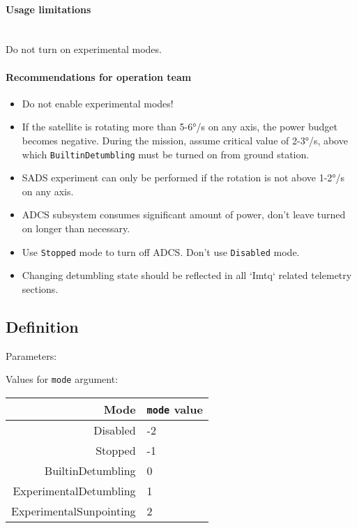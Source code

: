 \paragraph{Usage limitations} \mbox{} \\
Do not turn on experimental modes.

\paragraph{Recommendations for operation team}
\begin{itemize}
    \item Do not enable experimental modes!
    \item If the satellite is rotating more than 5-6°/s on any axis, the power budget becomes negative. During the mission, assume critical value of 2-3°/s, above which \texttt{BuiltinDetumbling} must be turned on from ground station.
    \item SADS experiment can only be performed if the rotation is not above 1-2°/s on any axis.    
    \item ADCS subsystem consumes significant amount of power, don't leave turned on longer than necessary.
    \item Use \texttt{Stopped} mode to turn off ADCS. Don't use \texttt{Disabled} mode.
    \item Changing detumbling state should be reflected in all `Imtq` related telemetry sections.
\end{itemize}

\subsection{Definition}

Parameters: 

\begin{tcarglist}	
\end{tcarglist}

Values for \texttt{mode} argument:

\begin{tabular}{r | l}
    Mode & \texttt{mode} value \\
    \hline
    Disabled & -2 \\
    Stopped & -1 \\
    BuiltinDetumbling & 0 \\
    ExperimentalDetumbling & 1 \\
    ExperimentalSunpointing & 2 \\
\end{tabular}


